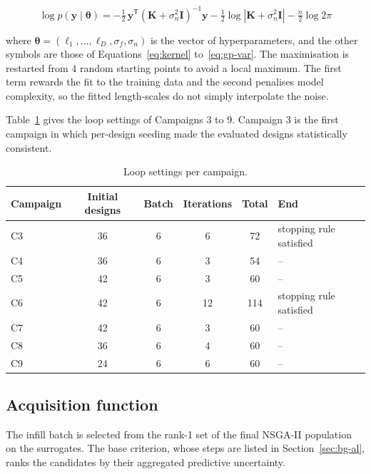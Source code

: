\begin{equation}
\log p(\mathbf{y} \mid \boldsymbol{\theta})
= -\tfrac{1}{2}\,\mathbf{y}^{\mathsf T}
\left( \mathbf{K} + \sigma_n^{2}\mathbf{I} \right)^{-1} \mathbf{y}
- \tfrac{1}{2} \log \left| \mathbf{K} + \sigma_n^{2}\mathbf{I} \right|
- \tfrac{n}{2} \log 2\pi
\label{eq:gp-lml}
\end{equation}

\noindent where $\boldsymbol{\theta} = (\ell_1, \dots, \ell_D,
\sigma_f, \sigma_n)$ is the vector of hyperparameters, and the other
symbols are those of Equations~\eqref{eq:kernel} to~\eqref{eq:gp-var}.
The maximisation is restarted from 4 random starting points to avoid
a local maximum. The first term rewards the fit to the training data and the
second penalises model complexity, so the fitted length-scales do not
simply interpolate the noise.

Table~\ref{tab:loop-settings} gives the loop settings of Campaigns 3
to 9. Campaign 3 is the first campaign in which per-design seeding made the evaluated designs statistically consistent.

\begin{table}[htbp]
  \centering
  \small
  \caption{Loop settings per campaign.}
  \label{tab:loop-settings}
  \begin{tabular}{@{}lccccl@{}}
    \toprule
    Campaign & Initial designs & Batch & Iterations & Total & End \\
    \midrule
    C3 & 36 & 6 & 6  & 72  & stopping rule satisfied \\
    C4 & 36 & 6 & 3  & 54  & -- \\
    C5 & 42 & 6 & 3  & 60  & -- \\
    C6 & 42 & 6 & 12 & 114 & stopping rule satisfied \\
    C7 & 42 & 6 & 3  & 60  & -- \\
    C8 & 36 & 6 & 4  & 60  & -- \\
    C9 & 24 & 6 & 6  & 60  & -- \\
    \bottomrule
  \end{tabular}
\end{table}

\subsection{Acquisition function}
\label{sec:meth-acq}

The infill batch is selected from the rank-1 set of the final NSGA-II
population on the surrogates. The base criterion, whose steps are
listed in Section~\ref{sec:bg-al}, ranks the candidates by their
aggregated predictive uncertainty.

